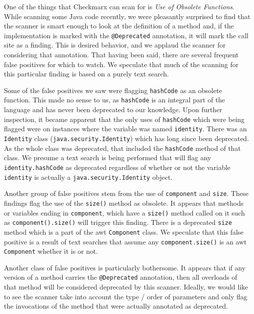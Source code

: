 One of the things that Checkmarx can scan for is \textit{Use of Obsolete Functions}. While scanning some Java code recently, we were pleasantly surprised to find that the scanner is smart enough to look at the definition of a method and, if the implementation is marked with the \texttt{@Deprecated} annotation, it will mark the call site as a finding. This is desired behavior, and we applaud the scanner for considering that annotation. That having been said, there are several frequent false positives for which to watch. We speculate that much of the scanning for this particular finding is based on a purely text search.

Some of the false positives we saw were flagging \texttt{hashCode} as an obsolete function. This made no sense to us, as \texttt{hashCode} is an integral part of the language and has never been deprecated to our knowledge. Upon further inspection, it became apparent that the only uses of \texttt{hashCode} which were being flagged were on instances where the variable was named \texttt{identity}. There was an \texttt{Identity} class (\texttt{java.security.Identity}) which has long since been deprecated. As the whole class was deprecated, that included the \texttt{hashCode} method of that class. We presume a text search is being performed that will flag any \texttt{identity.hashCode} as deprecated regardless of whether or not the variable \texttt{identity} is actually a \texttt{java.security.Identity} object.

Another group of false positives stem from the use of \texttt{component} and \texttt{size}. These findings flag the use of the \texttt{size()} method as obsolete. It appears that methods or variables ending in \texttt{component}, which have a \texttt{size()} method called on it such as \texttt{component().size()} will trigger this finding. There is a deprecated \texttt{size} method which is a part of the awt \texttt{Component} class. We speculate that this false positive is a result of text searches that assume any \texttt{component.size()} is an awt \texttt{Component} whether it is or not.

Another class of false positives is particularly bothersome. It appears that if any version of a method carries the \texttt{@Deprecated} annotation, then all overloads of that method will be considered deprecated by this scanner. Ideally, we would like to see the scanner take into account the type / order of parameters and only flag the invocations of the method that were actually annotated as deprecated.


